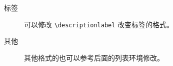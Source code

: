 {%
\renewcommand\descriptionlabel[1]{\normalfont\Large\itshape
  \textbullet\ #1}
\begin{description}
  \item[标签] 可以修改 \verb=\descriptionlabel= 改变标签的格式。
  \item[其他] 其他格式的也可以参考后面的列表环境修改。
\end{description}
}
